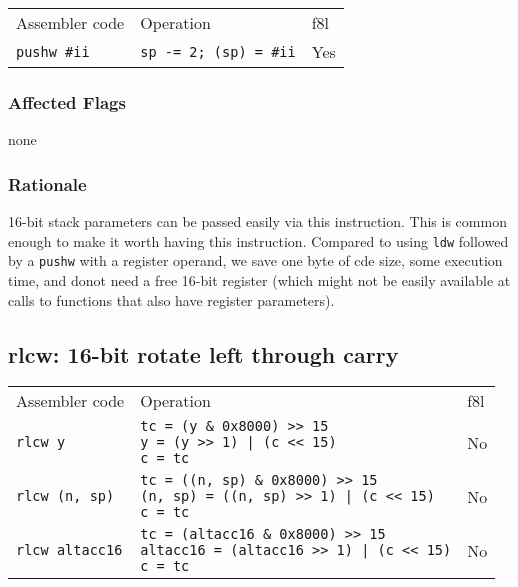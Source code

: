 \documentclass{book}
\begin{document}
\begin{tabular}{l l l}
Assembler code      & Operation                     & f8l \\
\texttt{pushw \#ii} & \texttt{sp -= 2; (sp) = \#ii} & Yes \\
\end{tabular}

\subsubsection*{Affected Flags}

none

\subsubsection*{Rationale}

16-bit stack parameters can be passed easily via this instruction. This is common enough to make it worth having this instruction. Compared to using \texttt{ldw} followed by a \texttt{pushw} with a register operand, we save one byte of cde size, some execution time, and donot need a free 16-bit register (which might not be easily available at calls to functions that also have register parameters).


\subsection{rlcw: 16-bit rotate left through carry}

\begin{tabular}{l l l}
Assembler code         & Operation                                                                                                             & f8l \\
\texttt{rlcw y}        & \makecell{\texttt{tc = (y \& 0x8000) >> 15}\\\texttt{y = (y >> 1) | (c << 15)}\\\texttt{c = tc}}                      & No \\
\texttt{rlcw (n, sp)}  & \makecell{\texttt{tc = ((n, sp) \& 0x8000) >> 15}\\\texttt{(n, sp) = ((n, sp) >> 1) | (c << 15)}\\\texttt{c = tc}}    & No \\
\texttt{rlcw altacc16} & \makecell{\texttt{tc = (altacc16 \& 0x8000) >> 15}\\\texttt{altacc16 = (altacc16 >> 1) | (c << 15)}\\\texttt{c = tc}} & No
\end{tabular}
\end{document}
